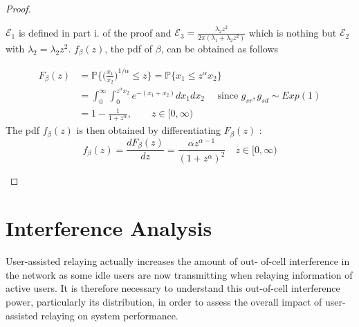 \begin{proof}
\begin{itemize}
$\mathcal{E}_1$ is defined in part i. of the proof and  $\mathcal{E}_3 = \frac{\lambda_2 z^2}{2\pi(\lambda_1+\lambda_2z^2)}$ which is nothing but $\mathcal{E}_2$ with $\lambda_2 = \lambda_2z^2$. $f_\beta(z)$, the pdf of $\beta$, can be obtained as follows

\begin{align*}
F_\beta(z) &= \mathbb{P}\bigg\{ \bigg( \frac{x_1}{x_2}\bigg)^{1/\alpha} \leq z \bigg\} = \mathbb{P} \{ x_1\leq z^\alpha x_2\} \\
&= \int_0^\infty \int_0^{z^\alpha x_2} e^{-(x_1+x_2)} dx_1dx_2 \quad \text{ since } g_{sr},g_{sd} \sim Exp(1) \\
&= 1-\frac{1}{1+z^\alpha}, \qquad z \in [0,\infty)
\end{align*}
The pdf $f_\beta(z)$ is then obtained by differentiating $F_\beta(z)$ :
\begin{equation*}
    f_\beta(z) = \frac{dF_\beta(z)}{dz} = \frac{\alpha z^{\alpha-1}}{(1+z^\alpha)^2} \quad z \in [0,\infty)
\end{equation*}
\end{itemize}
\end{proof}
\section{Interference Analysis} \label{sec:interference}
User-assisted relaying actually increases the amount of out-
of-cell interference in the network as some idle users are now
transmitting when relaying information of active users. It is
therefore necessary to understand this out-of-cell interference
power, particularly its distribution, in order to assess the overall
impact of user-assisted relaying on system performance.
